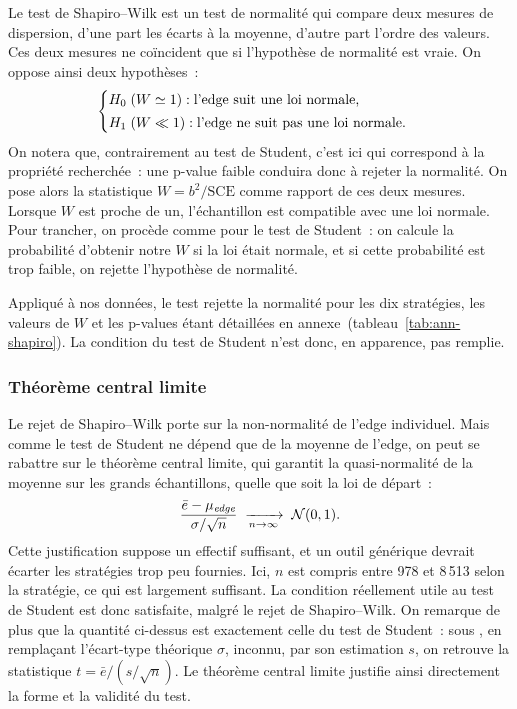 Le test de Shapiro--Wilk est un test de normalité qui compare deux
mesures de dispersion, d'une part les écarts à la moyenne, d'autre part
l'ordre des valeurs. Ces deux mesures ne coïncident que si l'hypothèse
de normalité est vraie. On oppose ainsi deux hypothèses~:
\[
  \begin{cases}
    H_0 \;(W \simeq 1) : \text{l'edge suit une loi normale,}\\[2pt]
    H_1 \;(W \ll 1) : \text{l'edge ne suit pas une loi normale.}
  \end{cases}
\]
On notera que, contrairement au test de Student, c'est ici \Hzero{} qui
correspond à la propriété recherchée~: une p-value faible conduira donc
à rejeter la normalité. On pose alors la statistique
\(W = b^2/\mathrm{SCE}\) comme rapport de ces deux mesures. Lorsque
\(W\) est proche de un, l'échantillon est compatible avec une loi
normale. Pour trancher, on procède comme pour le test de Student~: on
calcule la probabilité d'obtenir notre \(W\) si la loi était normale, et
si cette probabilité est trop faible, on rejette l'hypothèse de
normalité.

Appliqué à nos données, le test rejette la normalité pour les dix
stratégies, les valeurs de \(W\) et les p-values étant détaillées en
annexe~(tableau~\ref{tab:ann-shapiro}). La condition du test de Student
n'est donc, en apparence, pas remplie.

\subsubsection*{Théorème central limite}

Le rejet de Shapiro--Wilk porte sur la non-normalité de l'edge
individuel. Mais comme le test de Student ne dépend que de la moyenne de
l'edge, on peut se rabattre sur le théorème central limite, qui garantit
la quasi-normalité de la moyenne sur les grands échantillons, quelle que
soit la loi de départ~:
\[
  \frac{\bar e - \mu_{\textit{edge}}}{\sigma/\sqrt{n}}
  \;\xrightarrow[n \to \infty]{}\; \mathcal{N}(0,1) .
\]
Cette justification suppose un effectif suffisant, et un outil générique
devrait écarter les stratégies trop peu fournies. Ici, \(n\) est compris
entre 978 et 8\,513 selon la stratégie, ce qui est largement suffisant.
La condition réellement utile au test de Student est donc satisfaite,
malgré le rejet de Shapiro--Wilk. On remarque de plus que la quantité
ci-dessus est exactement celle du test de Student~: sous \Hzero{}, en
remplaçant l'écart-type théorique \(\sigma\), inconnu, par son
estimation \(s\), on retrouve la statistique
\(t = \bar e/(s/\sqrt{n})\). Le théorème central limite justifie ainsi
directement la forme et la validité du test.

